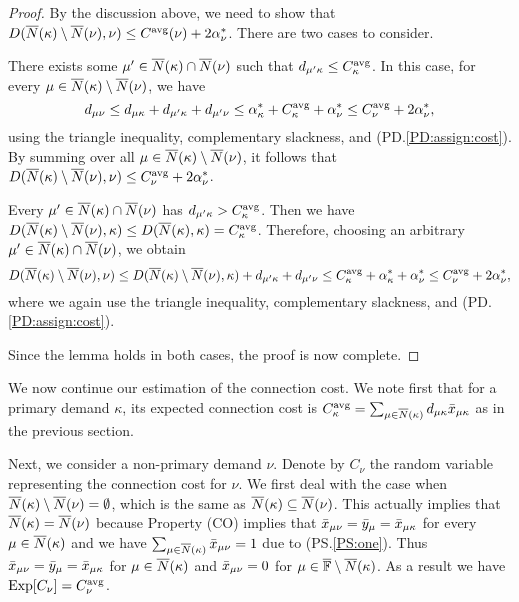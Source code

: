 \documentclass[11pt]{article}
\begin{document}
\begin{proof}
  By the discussion above, we need to show that $D({\overline{N}}(\kappa)
  \setminus {\overline{N}}(\nu), \nu) \leq C^{{\mbox{\scriptsize\rm avg}}}(\nu) +
  2\alpha_{\nu}^\ast$. There are two cases to consider.

\begin{description}
%	
\item{}
	 There exists some $\mu'\in {\overline{N}}(\kappa) \cap
  {\overline{N}}(\nu)$ such that $d_{\mu' \kappa} \leq C^{{\mbox{\scriptsize\rm avg}}}_\kappa$.
In this case, for every $\mu\in {\overline{N}}(\kappa)\setminus {\overline{N}}(\nu)$, we have
%
\begin{equation*}
d_{\mu \nu} \leq d_{\mu \kappa} + d_{\mu' \kappa} + d_{\mu' \nu}  
 	\le  \alpha^\ast_\kappa + C^{{\mbox{\scriptsize\rm avg}}}_\kappa + \alpha^\ast_{\nu}
  \leq C^{{\mbox{\scriptsize\rm avg}}}_\nu + 2\alpha_{\nu}^\ast,
\end{equation*}
%
using the triangle inequality, complementary slackness, and (PD.\ref{PD:assign:cost}).
By summing over all $\mu\in {\overline{N}}(\kappa) \setminus {\overline{N}}(\nu)$, it
follows that $D({\overline{N}}(\kappa) \setminus {\overline{N}}(\nu), \nu) \leq
C^{{\mbox{\scriptsize\rm avg}}}_\nu + 2\alpha_{\nu}^\ast$.

\item{}
 Every $\mu'\in {\overline{N}}(\kappa)\cap {\overline{N}}(\nu)$
has $d_{\mu'\kappa} > C^{{\mbox{\scriptsize\rm avg}}}_\kappa$. Then we
have $D({\overline{N}}(\kappa) \setminus {\overline{N}}(\nu),\kappa)\leq
D({\overline{N}}(\kappa),\kappa)=C^{{\mbox{\scriptsize\rm avg}}}_{\kappa}$. Therefore,
choosing an arbitrary $\mu'\in {\overline{N}}(\kappa)\cap {\overline{N}}(\nu)$,
we obtain
%
\begin{equation*}
  D({\overline{N}}(\kappa) \setminus {\overline{N}}(\nu), \nu) 
	\leq  D({\overline{N}}(\kappa) \setminus {\overline{N}}(\nu), \kappa) 
			+ d_{\mu' \kappa} + d_{\mu' \nu} 
	\leq  C^{{\mbox{\scriptsize\rm avg}}}_{\kappa} +
  \alpha_{\kappa}^\ast + \alpha_{\nu}^\ast
	\leq C^{{\mbox{\scriptsize\rm avg}}}_\nu + 2\alpha_{\nu}^\ast,
\end{equation*}
%
where we again use the triangle inequality,
complementary slackness, and  (PD.\ref{PD:assign:cost}).
%
\end{description}
%
Since the lemma holds in both cases, the proof is now complete.
\end{proof}

We now continue our estimation of the connection cost. We note first
that for a primary demand $\kappa$, its expected connection cost
is $C^{\mbox{\scriptsize\rm avg}}_{\kappa} = \sum_{\mu\in{\overline{N}}(\kappa)}
d_{\mu\kappa}{\bar x}_{\mu\kappa}$ as in the previous section.

Next, we consider a non-primary demand $\nu$.  Denote by $C_\nu$ the
random variable representing the connection cost for $\nu$. We first
deal with the case when ${\overline{N}}(\kappa)\setminus {\overline{N}}(\nu) =
\emptyset$, which is the same as ${\overline{N}}(\kappa) \subseteq
{\overline{N}}(\nu)$. This actually implies that ${\overline{N}}(\kappa) =
{\overline{N}}(\nu)$ because Property (CO) implies that ${\bar x}_{\mu\nu} =
{\bar y}_{\mu} = {\bar x}_{\mu\kappa}$ for every $\mu \in {\overline{N}}(\kappa)$
and we have $\sum_{\mu\in{\overline{N}}(\kappa)} {\bar x}_{\mu\nu} = 1$ due to
(PS.\ref{PS:one}). Thus ${\bar x}_{\mu\nu} = {\bar y}_{\mu} =
{\bar x}_{\mu\kappa}$ for $\mu \in {\overline{N}}(\kappa)$ and ${\bar x}_{\mu\nu} =
0$ for $\mu\in \overline{\mathbb{F}} \setminus {\overline{N}}(\kappa)$. As a result we
have $\mbox{\rm Exp}[C_{\nu}] = C^{{\mbox{\scriptsize\rm avg}}}_{\nu}$.
\end{document}
